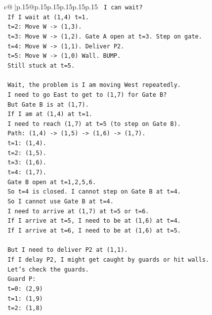 \documentclass{article}
\begin{document}
{\begin{supertabular}{c@{$\;$}|p{.15\linewidth}@{}p{.15\linewidth}p{.15\linewidth}p{.15\linewidth}p{.15\linewidth}p{.15\linewidth}}
{{{\texttt{   I can wait?} \\
\texttt{   If I wait at (1,4) t=1.} \\
\texttt{   t=2: Move W {-}> (1,3).} \\
\texttt{   t=3: Move W {-}> (1,2). Gate A open at t=3. Step on gate.} \\
\texttt{   t=4: Move W {-}> (1,1). Deliver P2.} \\
\texttt{   t=5: Move W {-}> (1,0) Wall. BUMP.} \\
\texttt{   Still stuck at t=5.} \\
\\ 
\texttt{   Wait, the problem is I am moving West repeatedly.} \\
\texttt{   I need to go East to get to (1,7) for Gate B?} \\
\texttt{   But Gate B is at (1,7).} \\
\texttt{   If I am at (1,4) at t=1.} \\
\texttt{   I need to reach (1,7) at t=5 (to step on Gate B).} \\
\texttt{   Path: (1,4) {-}> (1,5) {-}> (1,6) {-}> (1,7).} \\
\texttt{   t=1: (1,4).} \\
\texttt{   t=2: (1,5).} \\
\texttt{   t=3: (1,6).} \\
\texttt{   t=4: (1,7).} \\
\texttt{   Gate B open at t=1,2,5,6.} \\
\texttt{   So t=4 is closed. I cannot step on Gate B at t=4.} \\
\texttt{   So I cannot use Gate B at t=4.} \\
\texttt{   I need to arrive at (1,7) at t=5 or t=6.} \\
\texttt{   If I arrive at t=5, I need to be at (1,6) at t=4.} \\
\texttt{   If I arrive at t=6, I need to be at (1,6) at t=5.} \\
\\ 
\texttt{   But I need to deliver P2 at (1,1).} \\
\texttt{   If I delay P2, I might get caught by guards or hit walls.} \\
\texttt{   Let's check the guards.} \\
\texttt{   Guard P:} \\
\texttt{   t=0: (2,9)} \\
\texttt{   t=1: (1,9)} \\
\texttt{   t=2: (1,8)} \\
}}}
\end{supertabular}}
\end{document}
